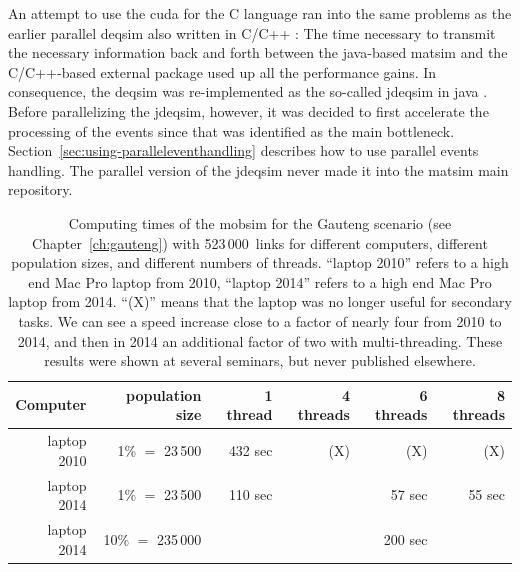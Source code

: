 An attempt to use the \gls{cuda} for the C language \citep{StrippgenNagel2009CUDA,StrippgenNagel2009CUDA2,Strippgen2009Diss} ran into the same problems as the earlier parallel \gls{deqsim} also written in C/C++ \citep{CharyparAxhausenEtAl2007event-drivenparallelqueue-based}: The time necessary to transmit the necessary information back and forth between the \gls{java}-based \gls{matsim} and the C/C++-based external package used up all the performance gains.  In consequence, the \gls{deqsim} was re-implemented as the so-called \gls{jdeqsim} in \gls{java} \citep[][also see Section~\ref{sec:using-jdeqsim}]{WaraichEtAl_HelbichEtAl_2015}.  Before parallelizing the \gls{jdeqsim}, however, it was decided to first accelerate the processing of the events since that was identified as the main bottleneck.  Section~\ref{sec:using-paralleleventhandling} describes how to use parallel events handling.  The parallel version of the \gls{jdeqsim} \citep[][]{WaraichEtAl_HelbichEtAl_2015} never made it into the \gls{matsim} main repository.

\begin{table}
  \caption{ Computing times of the \gls{mobsim} for the Gauteng scenario (see Chapter~\ref{ch:gauteng}) with 523\,000~links for different computers, different population sizes, and different numbers of threads.  ``laptop 2010'' refers to a high end Mac Pro laptop from 2010, ``laptop 2014'' refers to a high end Mac Pro laptop from 2014. ``(X)'' means that the laptop was no longer useful for secondary tasks. We can see a speed increase close to a factor of nearly four from 2010 to 2014, and then in 2014 an additional factor of two with multi-threading.  These results were shown at several seminars, but never published elsewhere.}
  \label{tab:threaded-computing-times}
\centering
  \begin{tabular}{|r|r||r|r|r|r|}
    \hline
Computer & population size & 1 thread & 4 threads & 6 threads & 8 threads \\
\hline
\hline
laptop 2010 & 1\% $=$ 23\,500 & 432 sec & (X) & (X) & (X) \\
\hline
laptop 2014 & 1\% $=$ 23\,500 & 110 sec & & 57 sec & 55 sec \\
\hline
laptop 2014 & 10\% $=$ 235\,000 & & & 200 sec & \\
\hline
  \end{tabular}
\end{table}
  
